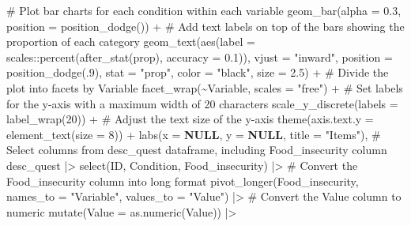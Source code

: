 \documentclass[
  bookmarksnumbered]{article}
\newenvironment{Shaded}{\begin{snugshade}}{\end{snugshade}}
\newcommand{\AttributeTok}[1]{\textcolor[rgb]{0.80,0.80,0.80}{#1}}
\newcommand{\CommentTok}[1]{\textcolor[rgb]{0.50,0.62,0.50}{#1}}
\newcommand{\ConstantTok}[1]{\textcolor[rgb]{0.86,0.64,0.64}{\textbf{#1}}}
\newcommand{\DecValTok}[1]{\textcolor[rgb]{0.86,0.86,0.80}{#1}}
\newcommand{\FloatTok}[1]{\textcolor[rgb]{0.75,0.75,0.82}{#1}}
\newcommand{\FunctionTok}[1]{\textcolor[rgb]{0.94,0.94,0.56}{#1}}
\newcommand{\NormalTok}[1]{\textcolor[rgb]{0.80,0.80,0.80}{#1}}
\newcommand{\SpecialCharTok}[1]{\textcolor[rgb]{0.86,0.64,0.64}{#1}}
\newcommand{\StringTok}[1]{\textcolor[rgb]{0.80,0.58,0.58}{#1}}
\begin{document}
\begin{Shaded}
\begin{Highlighting}[]
    \CommentTok{\# Plot bar charts for each condition within each variable}
    \FunctionTok{geom\_bar}\NormalTok{(}\AttributeTok{alpha =} \FloatTok{0.3}\NormalTok{, }\AttributeTok{position =} \FunctionTok{position\_dodge}\NormalTok{()) }\SpecialCharTok{+}
    \CommentTok{\# Add text labels on top of the bars showing the proportion of each category}
    \FunctionTok{geom\_text}\NormalTok{(}\FunctionTok{aes}\NormalTok{(}\AttributeTok{label =}\NormalTok{ scales}\SpecialCharTok{::}\FunctionTok{percent}\NormalTok{(}\FunctionTok{after\_stat}\NormalTok{(prop), }\AttributeTok{accuracy =} \FloatTok{0.1}\NormalTok{)),}
              \AttributeTok{vjust =} \StringTok{"inward"}\NormalTok{,}
              \AttributeTok{position =} \FunctionTok{position\_dodge}\NormalTok{(.}\DecValTok{9}\NormalTok{),}
              \AttributeTok{stat =} \StringTok{"prop"}\NormalTok{,}
              \AttributeTok{color =} \StringTok{"black"}\NormalTok{,}
              \AttributeTok{size =} \FloatTok{2.5}\NormalTok{) }\SpecialCharTok{+}
    \CommentTok{\# Divide the plot into facets by Variable}
    \FunctionTok{facet\_wrap}\NormalTok{(}\SpecialCharTok{\textasciitilde{}}\NormalTok{Variable, }\AttributeTok{scales =} \StringTok{"free"}\NormalTok{) }\SpecialCharTok{+}
    \CommentTok{\# Set labels for the y{-}axis with a maximum width of 20 characters}
    \FunctionTok{scale\_y\_discrete}\NormalTok{(}\AttributeTok{labels =} \FunctionTok{label\_wrap}\NormalTok{(}\DecValTok{20}\NormalTok{)) }\SpecialCharTok{+}
    \CommentTok{\# Adjust the text size of the y{-}axis}
    \FunctionTok{theme}\NormalTok{(}\AttributeTok{axis.text.y =} \FunctionTok{element\_text}\NormalTok{(}\AttributeTok{size =} \DecValTok{8}\NormalTok{)) }\SpecialCharTok{+}
    \FunctionTok{labs}\NormalTok{(}\AttributeTok{x =} \ConstantTok{NULL}\NormalTok{, }\AttributeTok{y =} \ConstantTok{NULL}\NormalTok{, }\AttributeTok{title =} \StringTok{"Items"}\NormalTok{),}
  \CommentTok{\# Select columns from desc\_quest dataframe, including Food\_insecurity column}
\NormalTok{  desc\_quest }\SpecialCharTok{|\textgreater{}}
    \FunctionTok{select}\NormalTok{(ID, Condition, Food\_insecurity) }\SpecialCharTok{|\textgreater{}}
    \CommentTok{\# Convert the Food\_insecurity column into long format}
    \FunctionTok{pivot\_longer}\NormalTok{(Food\_insecurity,}
                 \AttributeTok{names\_to =} \StringTok{"Variable"}\NormalTok{,}
                 \AttributeTok{values\_to =} \StringTok{"Value"}\NormalTok{) }\SpecialCharTok{|\textgreater{}}
    \CommentTok{\# Convert the Value column to numeric}
    \FunctionTok{mutate}\NormalTok{(}\AttributeTok{Value =} \FunctionTok{as.numeric}\NormalTok{(Value)) }\SpecialCharTok{|\textgreater{}}

\end{Highlighting}
\end{Shaded}
\end{document}
